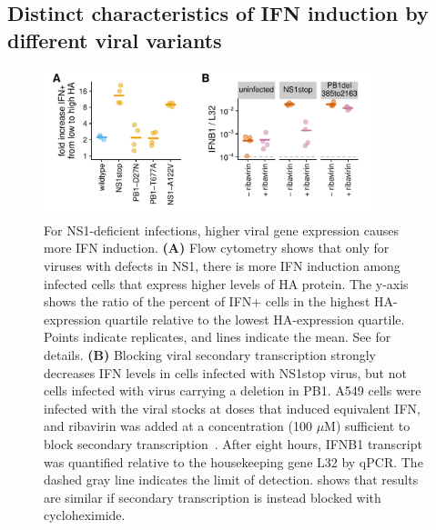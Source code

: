\documentclass[9pt,lineno]{elife}
\begin{document}
\subsection{Distinct characteristics of IFN induction by different viral variants}

\begin{figure}

\centerline{\includegraphics[width=0.85\textwidth]{figures/MutantComparison/p_merged.pdf}}
\caption{
For NS1-deficient infections, higher viral gene expression causes more IFN induction.
{\bf (A)}
Flow cytometry shows that only for viruses with defects in NS1, there is more IFN induction among infected cells that express higher levels of HA protein.
The y-axis shows the ratio of the percent of IFN+ cells in the highest HA-expression quartile relative to the lowest HA-expression quartile.
Points indicate replicates, and lines indicate the mean.
See  for details.
{\bf (B)}
Blocking viral secondary transcription strongly decreases IFN levels in cells infected with NS1stop virus, but not cells infected with virus carrying a deletion in PB1.
A549 cells were infected with the viral stocks at doses that induced equivalent IFN, and ribavirin was added at a concentration (100 $\mu$M) sufficient to block secondary transcription~\citep{Vanderlinden:2016ec,Reuther:2015ef,Scholtissek:1976wg}.
After eight hours, IFNB1 transcript was quantified relative to the housekeeping gene L32 by qPCR. 
The dashed gray line indicates the limit of detection.
 shows that results are similar if secondary transcription is instead blocked with cycloheximide.
}
\label{fig:mutantcomparison}


\end{figure}
\end{document}
